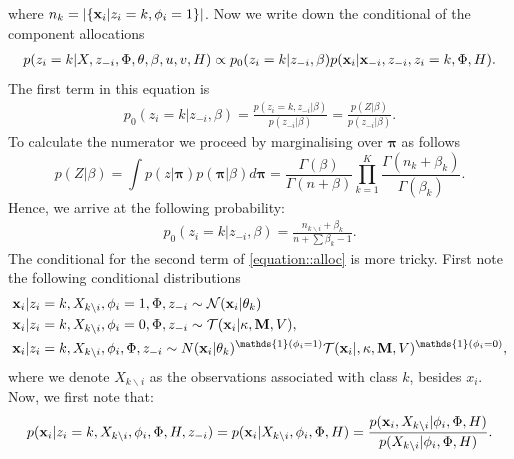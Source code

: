 \documentclass[12pt,english]{article}
\begin{document}
where $n_k = \lvert\{{\bf x}_i|z_i=k, \phi_i = 1\}\rvert$.
Now we write down the conditional of the component allocations
\begin{equation} \label{equation::alloc}
\begin{split}
p(z_i = k|X,z_{-i},\Phi, \theta, \beta, u,v, H) \propto p_0(z_i = k|z_{-i},\beta)p({\bf x}_i|{\bf x}_{-i},z_{-i}, z_i = k,\Phi, H).
\end{split}
\end{equation}
The first term in this equation is
\begin{equation}
\begin{split}
 p_0(z_i = k|z_{-i},\beta) = \frac{p(z_i = k, z_{-i}|\beta)}{p(z_{-i}|\beta)} = \frac{p(Z|\beta)}{p(z_{-i}|\beta)}.
\end{split}
\end{equation}
To calculate the numerator we proceed by marginalising over $\boldsymbol{\pi}$ as follows
\begin{equation}
p(Z|\beta) = \int p(z|\boldsymbol{\pi})p(\boldsymbol{\pi}|\beta) d\boldsymbol{\pi} = \frac{\Gamma(\beta)}{\Gamma(n + \beta)}\prod_{k=1}^{K}\frac{\Gamma(n_k + \beta_k)}{\Gamma(\beta_k)}.
\end{equation}
Hence, we arrive at the following probability:
\begin{equation}
\begin{split}
p_0(z_i = k|z_{-i},\beta) = \frac{n_{k \backslash i} + \beta_k}{n + \sum \beta_k - 1}.
\end{split}
\end{equation}
The conditional for the second term of \ref{equation::alloc} is more tricky. First note the following conditional distributions
\begin{equation}
\begin{split}
{\bf x}_i |& z_i = k, X_{k\backslash i}, \phi_i = 1, \Phi, z_{-i} \sim \mathcal{N}({\bf x}_i|\theta_{k})\\
{\bf x}_i |& z_i = k, X_{k\backslash i}, \phi_i = 0, \Phi, z_{-i} \sim \mathcal{T}({\bf x}_i|\kappa, {\bf M},V), \\
{\bf x}_i |& z_i = k, X_{k\backslash i}, \phi_i, \Phi, z_{-i}\sim N({\bf x}_i|\theta_{k})^{\mathds{1}(\phi_i=1)}\mathcal{T}({\bf x}_i|,\kappa,{\bf M},V)^{\mathds{1}(\phi_i=0)}, \\
\end{split}
\end{equation}
where we denote $X_{k\backslash i}$ as the observations associated with class $k$, besides $x_i$. Now, we first note that:
\begin{equation}\label{equation::predicitve}
\begin{split}
p({\bf x}_i| z_i = k, X_{k\backslash i}, \phi_i, \Phi, H, z_{-i}) =  p({\bf x}_i|X_{k\backslash i}, \phi_i, \Phi, H) = \frac{p({\bf x}_i, X_{k\backslash i}|\phi_i, \Phi, H)}{p(X_{k\backslash i}|\phi_i, \Phi, H)}.
\end{split}
\end{equation}
\end{document}
